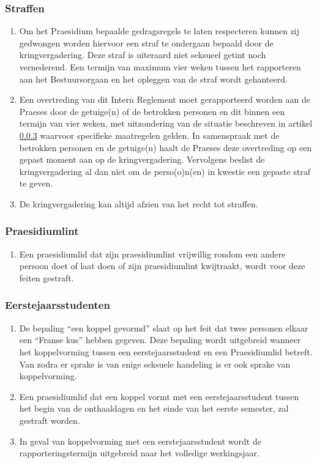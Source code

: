     \subsubsection{Straffen}\label{art:praesidium-straffen}
    \begin{enumerate}
    \item Om het Praesidium bepaalde gedragsregels te laten respecteren kunnen zij gedwongen worden
    hiervoor een straf te ondergaan bepaald door de kringvergadering. Deze straf is uiteraard niet seksueel getint noch vernederend. Een termijn van maximum vier weken tussen het rapporteren aan het Bestuursorgaan en het opleggen van de straf wordt gehanteerd.
    \item Een overtreding van dit Intern Reglement moet gerapporteerd worden aan de Praeses door de getuige(n) of de betrokken personen en dit binnen een termijn van vier weken, met uitzondering van de situatie beschreven in artikel \ref{art:koppel-eerstejaars} waarvoor specifieke maatregelen gelden. In samenspraak met de betrokken personen en de getuige(n) haalt de Praeses deze overtreding op een gepast moment aan op de kringvergadering. Vervolgens beslist de kringvergadering al dan niet om de perso(o)n(en) in kwestie een gepaste straf te geven.
    \item De kringvergadering kan altijd afzien van het recht tot straffen.
    \end{enumerate}
    
    \subsubsection{Praesidiumlint}
    \begin{enumerate}
    \item Een praesidiumlid dat zijn praesidiumlint vrijwillig rondom een andere persoon doet of laat doen of zijn praesidiumlint kwijtraakt, wordt voor deze feiten gestraft.
    \end{enumerate}

    \subsubsection{Eerstejaarsstudenten}\label{art:koppel-eerstejaars}
    \begin{enumerate}
    \item De bepaling “een koppel gevormd” slaat op het feit dat twee personen elkaar een “Franse kus”
hebben gegeven. 
    Deze bepaling wordt uitgebreid wanneer het koppelvorming tussen een eerstejaarsstudent en een Praesidiumlid betreft. Van zodra er sprake is van enige seksuele handeling is er ook sprake van koppelvorming.
    \item Een praesidiumlid dat een koppel vormt met een eerstejaarsstudent tussen het begin van de onthaaldagen en het einde van het eerste semester, zal gestraft worden.
    \item In geval van koppelvorming met een eerstejaarsstudent wordt de rapporteringstermijn uitgebreid naar het volledige werkingsjaar. 
    \end{enumerate}

